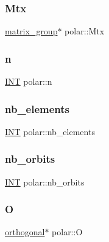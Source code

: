 \subsubsection{\texorpdfstring{Mtx}{Mtx}}
{\footnotesize\ttfamily \mbox{\hyperlink{classmatrix__group}{matrix\+\_\+group}}$\ast$ polar\+::\+Mtx}

\mbox{\label{classpolar_af29b4ac62d2c71db216f2875fddf29a5}} 
\subsubsection{\texorpdfstring{n}{n}}
{\footnotesize\ttfamily \mbox{\hyperlink{galois_8h_a09fddde158a3a20bd2dcadb609de11dc}{I\+NT}} polar\+::n}

\mbox{\label{classpolar_a3078c99a8796a894bdd4cdb20d576d58}} 
\subsubsection{\texorpdfstring{nb\+\_\+elements}{nb\_elements}}
{\footnotesize\ttfamily \mbox{\hyperlink{galois_8h_a09fddde158a3a20bd2dcadb609de11dc}{I\+NT}} polar\+::nb\+\_\+elements}

\mbox{\label{classpolar_a516ad1db4c822f72ecfdced61d63258e}} 
\subsubsection{\texorpdfstring{nb\+\_\+orbits}{nb\_orbits}}
{\footnotesize\ttfamily \mbox{\hyperlink{galois_8h_a09fddde158a3a20bd2dcadb609de11dc}{I\+NT}} polar\+::nb\+\_\+orbits}

\mbox{\label{classpolar_a6c73f461c6d761d94c6657953e6cddf8}} 
\subsubsection{\texorpdfstring{O}{O}}
{\footnotesize\ttfamily \mbox{\hyperlink{classorthogonal}{orthogonal}}$\ast$ polar\+::O}

\mbox{\label{classpolar_aca30c530eb840315f0f886f18c88fe42}} 

